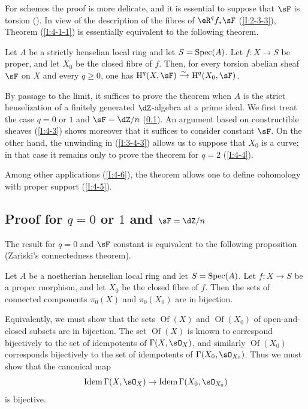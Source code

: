 For schemes the proof is more delicate, and it is essential to suppose
that $\sF$ is torsion (\cite[XII.2]{sga4}). In view of the description of
the fibres of $\eR^qf_*\sF$ (\ref{I:2-3-3}), Theorem
(\ref{I:4-1-1}) is essentially equivalent to the following theorem.

\begin{theorem}\label{I:4-1-2}
Let $A$ be a strictly henselian local ring and let $S=\operatorname{Spec}(A)$. Let
$f:X\to S$ be proper, and let $X_0$ be the closed fibre of $f$. Then, for every
torsion abelian sheaf $\sF$ on $X$ and every $q\geqslant0$, one has
$\h^q(X,\sF)\iso\h^q(X_0,\sF)$.
\end{theorem}

By passage to the limit, it suffices to prove the theorem when $A$ is the
strict henselization of a finitely generated $\dZ$-algebra at a prime
ideal. We first treat the case $q=0$ or $1$ and $\sF=\dZ/n$
(\ref{I:4-2}). An argument based on constructible sheaves (\ref{I:4-3})
shows moreover that it suffices to consider constant $\sF$. On the other
hand, the unwinding in (\ref{I:3-4-3}) allows us to suppose that $X_0$
is a curve; in that case it remains only to prove the theorem for $q=2$
(\ref{I:4-4}).

Among other applications (\ref{I:4-6}), the theorem allows one to define
cohomology with proper support (\ref{I:4-5}).

\subsection{Proof for \texorpdfstring{$q=0$}{q=0} or \texorpdfstring{$1$}{1} and \texorpdfstring{$\sF=\dZ/n$}{\sF=Z/n}}\label{I:4-2}

The result for $q=0$ and $\sF$ constant is equivalent to the following
proposition (Zariski's connectedness theorem).

\begin{proposition}\label{I:4-2-1}
Let $A$ be a noetherian henselian local ring and let $S=\operatorname{Spec}(A)$. Let
$f:X\to S$ be a proper morphism, and let $X_0$ be the closed fibre of
$f$. Then the sets of connected components $\pi_0(X)$ and
$\pi_0(X_0)$ are in bijection.
\end{proposition}

Equivalently, we must show that the sets $\operatorname{Of}(X)$ and
$\operatorname{Of}(X_0)$ of open-and-closed subsets are in bijection.
The set $\operatorname{Of}(X)$ is known to correspond bijectively to the
set of idempotents of $\Gamma(X,\sO_X)$, and similarly
$\operatorname{Of}(X_0)$ corresponds bijectively to the set of
idempotents of $\Gamma(X_0,\sO_{X_0})$. Thus we must show that the
canonical map
\[
  \operatorname{Idem} \Gamma(X,\sO_X) \to \operatorname{Idem}\Gamma(X_0,\sO_{X_0})
\]
is bijective.


